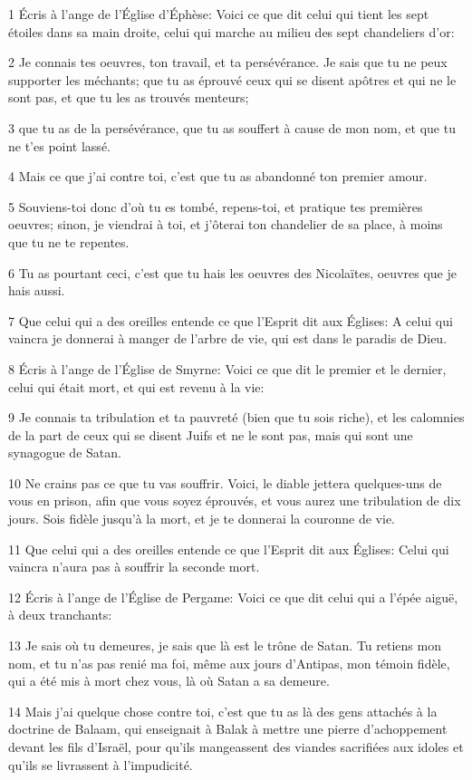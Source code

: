 \par 1 Écris à l'ange de l'Église d'Éphèse: Voici ce que dit celui qui tient les sept étoiles dans sa main droite, celui qui marche au milieu des sept chandeliers d'or:
\par 2 Je connais tes oeuvres, ton travail, et ta persévérance. Je sais que tu ne peux supporter les méchants; que tu as éprouvé ceux qui se disent apôtres et qui ne le sont pas, et que tu les as trouvés menteurs;
\par 3 que tu as de la persévérance, que tu as souffert à cause de mon nom, et que tu ne t'es point lassé.
\par 4 Mais ce que j'ai contre toi, c'est que tu as abandonné ton premier amour.
\par 5 Souviens-toi donc d'où tu es tombé, repens-toi, et pratique tes premières oeuvres; sinon, je viendrai à toi, et j'ôterai ton chandelier de sa place, à moins que tu ne te repentes.
\par 6 Tu as pourtant ceci, c'est que tu hais les oeuvres des Nicolaïtes, oeuvres que je hais aussi.
\par 7 Que celui qui a des oreilles entende ce que l'Esprit dit aux Églises: A celui qui vaincra je donnerai à manger de l'arbre de vie, qui est dans le paradis de Dieu.
\par 8 Écris à l'ange de l'Église de Smyrne: Voici ce que dit le premier et le dernier, celui qui était mort, et qui est revenu à la vie:
\par 9 Je connais ta tribulation et ta pauvreté (bien que tu sois riche), et les calomnies de la part de ceux qui se disent Juifs et ne le sont pas, mais qui sont une synagogue de Satan.
\par 10 Ne crains pas ce que tu vas souffrir. Voici, le diable jettera quelques-uns de vous en prison, afin que vous soyez éprouvés, et vous aurez une tribulation de dix jours. Sois fidèle jusqu'à la mort, et je te donnerai la couronne de vie.
\par 11 Que celui qui a des oreilles entende ce que l'Esprit dit aux Églises: Celui qui vaincra n'aura pas à souffrir la seconde mort.
\par 12 Écris à l'ange de l'Église de Pergame: Voici ce que dit celui qui a l'épée aiguë, à deux tranchants:
\par 13 Je sais où tu demeures, je sais que là est le trône de Satan. Tu retiens mon nom, et tu n'as pas renié ma foi, même aux jours d'Antipas, mon témoin fidèle, qui a été mis à mort chez vous, là où Satan a sa demeure.
\par 14 Mais j'ai quelque chose contre toi, c'est que tu as là des gens attachés à la doctrine de Balaam, qui enseignait à Balak à mettre une pierre d'achoppement devant les fils d'Israël, pour qu'ils mangeassent des viandes sacrifiées aux idoles et qu'ils se livrassent à l'impudicité.
